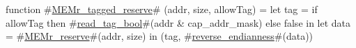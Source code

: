 function #\hyperref[sailMIPSzMEMrzytaggedzyreserve]{MEMr\_tagged\_reserve}# (addr, size, allowTag) =
{
  let tag = if allowTag then #\hyperref[sailMIPSzreadzytagzybool]{read\_tag\_bool}#(addr & cap_addr_mask) else false in
  let data = #\hyperref[sailMIPSzMEMrzyreserve]{MEMr\_reserve}#(addr, size) in
  (tag, #\hyperref[sailMIPSzreversezyendianness]{reverse\_endianness}#(data))
}
